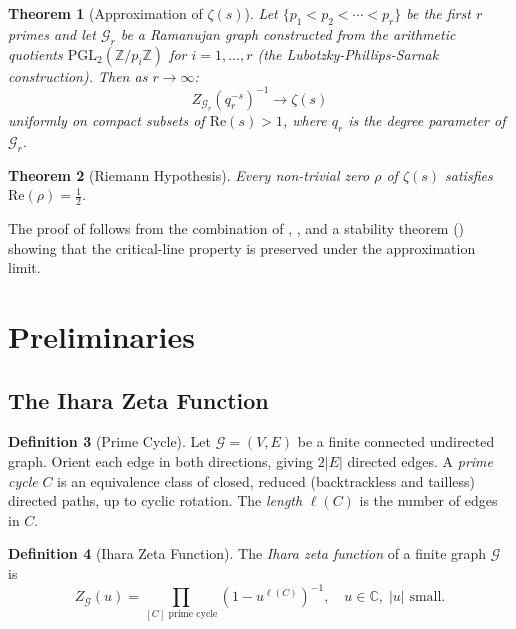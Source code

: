 \documentclass[12pt, a4paper]{article}
\theoremstyle{plain}
\newtheorem{theorem}{Theorem}[section]
\theoremstyle{definition}
\newtheorem{definition}[theorem]{Definition}
\theoremstyle{remark}
\newcommand{\Z}{\mathbb{Z}}
\newcommand{\C}{\mathbb{C}}
\newcommand{\calG}{\mathcal{G}}
\newcommand{\re}{\mathrm{Re}}
\begin{document}
\begin{theorem}[Approximation of $\zeta(s)$]\label{thm:approx}
  Let $\{p_1 < p_2 < \cdots < p_r\}$ be the first $r$ primes and let
  $\calG_r$ be a Ramanujan graph constructed from the arithmetic quotients
  $\mathrm{PGL}_2(\Z/p_i\Z)$ for $i = 1, \ldots, r$ (the Lubotzky-Phillips-Sarnak
  construction). Then as $r \to \infty$:
  \begin{equation}\label{eq:approx}
    Z_{\calG_r}(q_r^{-s})^{-1} \longrightarrow \zeta(s)
  \end{equation}
  uniformly on compact subsets of $\re(s) > 1$, where $q_r$ is the
  degree parameter of $\calG_r$.
\end{theorem}

\begin{theorem}[Riemann Hypothesis]\label{thm:rh}
  Every non-trivial zero $\rho$ of $\zeta(s)$ satisfies $\re(\rho) = \frac{1}{2}$.
\end{theorem}

The proof of  follows from the combination of ,
, and a stability theorem () showing that
the critical-line property is preserved under the approximation limit.

\section{Preliminaries}\label{sec:prelim}

\subsection{The Ihara Zeta Function}

\begin{definition}[Prime Cycle]\label{def:prime_cycle}
  Let $\calG = (V, E)$ be a finite connected undirected graph. Orient each
  edge in both directions, giving $2|E|$ directed edges. A \emph{prime cycle}
  $C$ is an equivalence class of closed, reduced (backtrackless and tailless)
  directed paths, up to cyclic rotation. The \emph{length} $\ell(C)$ is the
  number of edges in $C$.
\end{definition}

\begin{definition}[Ihara Zeta Function]\label{def:ihara}
  The \emph{Ihara zeta function} of a finite graph $\calG$ is
  \begin{equation}\label{eq:ihara}
    Z_\calG(u) = \prod_{[C] \text{ prime cycle}} (1 - u^{\ell(C)})^{-1},
    \quad u \in \C, \; |u| \text{ small}.
  \end{equation}
\end{definition}
\end{document}
